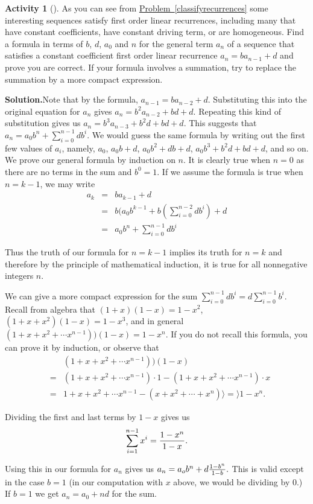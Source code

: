 \documentclass[10pt,]{book}
\theoremstyle{plain}
\theoremstyle{definition}
\newtheorem{activity}[project]{Activity}
\numberwithin{equation}{chapter}
\newcommand{\amp}{&}
\begin{document}
\begin{activity}[]\label{firstordlinconst}
As you can see from \hyperref[classifyrecurrences]{Problem~\ref{classifyrecurrences}} some interesting sequences satisfy first order linear recurrences, including many that have constant coefficients, have constant driving term, or are homogeneous. Find a formula in terms of \(b\), \(d\), \(a_0\) and \(n\) for the general term \(a_n\) of a sequence that satisfies a constant coefficient first order linear recurrence \(a_n = ba_{n-1} + d\) and prove you are correct. If your formula involves a summation, try to replace the summation by a more compact expression.%
\par\medskip\noindent%
\textbf{Solution.}\quad Note that by the formula, \(a_{n-1}=ba_{n-2} +d\). Substituting this into the original equation for \(a_n\) gives \(a_n=b^2a_{n-2}+bd +d\). Repeating this kind of substitution gives us \(a_n=b^3a_{n-3} +b^2d +bd +d\). This suggests that \(a_n = a_0b^n +\sum_{i=0}^{n-1}db^i\). We would guess the same formula by writing out the first few values of \(a_i\), namely, \(a_0\), \(a_0b+d\), \(a_0b^2+db+d\), \(a_0b^3+b^2d+bd+d\), and so on. We prove our general formula by induction on \(n\). It is clearly true when \(n=0\) as there are no terms in the sum and \(b^0=1\). If we assume the formula is true when \(n=k-1\), we may write%
\begin{align*}
a_k \amp =\amp  ba_{k-1}+d\\
\amp =\amp b(a_0b^{k-1}+ b\left(\sum_{i=0}^{n-2}db^i\right) +d\\
\amp =\amp a_0b^n +\sum_{i=0}^{n-1}db^i
\end{align*}
%
\par
Thus the truth of our formula for \(n=k-1\) implies its truth for \(n=k\) and therefore by the principle of mathematical induction, it is true for all nonnegative integers \(n\).%
\par
We can give a more compact expression for the sum \(\sum_{i=0}^{n-1}db^i=d\sum_{i=0}^{n-1}b^i\). Recall from algebra that \((1+x)(1-x)= 1-x^2\), \((1+x+x^2)(1-x) = 1-x^3\), and in general \((1+x+x^2+\cdots
x^{n-1}))(1-x) = 1-x^n\). If you do not recall this formula, you can prove it by induction, or observe that%
\begin{align*}
\amp \amp (1+x+x^2+\cdots
x^{n-1}))(1-x)\\
\amp =\amp  (1+x+x^2+\cdots
x^{n-1})\cdot 1-(1+x+x^2+\cdots
x^{n-1})\cdot x\\
\amp =\amp  1+x+x^2+\cdots x^{n-1}-(x+x^2+\cdots+x^n)\rangle =\rangle  1-x^n.
\end{align*}
%
\par
Dividing the first and last terms by \(1-x\) gives us%
\begin{equation*}
\sum_{i=1}^{n-1}x^i={1-x^n\over 1-x}.
\end{equation*}
%
\par
Using this in our formula for \(a_n\) gives us \(a_n =a_ob^n+d{1-b^n\over 1-b}.\) This is valid except in the case \(b=1\) (in our computation with \(x\) above, we would be dividing by 0.) If \(b=1\) we get \(a_n =a_0 +nd\) for the sum.%
\end{activity}
\end{document}
